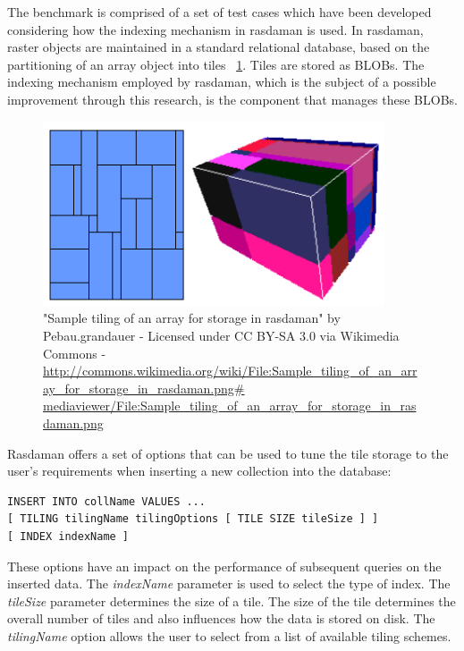 \documentclass[11pt, a4paper, oneside]{article}
\begin{document}
The benchmark is comprised of a set of test cases which have been developed considering how the indexing mechanism in rasdaman is used. In rasdaman, raster objects are maintained in a standard relational database, based on the partitioning of an array object into tiles\cite{DBLP:conf/icde/FurtadoB99} ~\ref{fig:rasdaman-tile}. Tiles are stored as BLOBs. The indexing mechanism employed by rasdaman, which is the subject of a possible improvement through this research, is the component that manages these BLOBs.

\begin{figure}[H]
  \centering
    \includegraphics[width=0.9\textwidth]{img/tiling}
    \caption{"Sample tiling of an array for storage in rasdaman" by Pebau.grandauer - Licensed under CC BY-SA 3.0 via Wikimedia Commons -\url{http://commons.wikimedia.org/wiki/File:Sample_tiling_of_an_array_for_storage_in_rasdaman.png\# mediaviewer/File:Sample_tiling_of_an_array_for_storage_in_rasdaman.png }}
  \label{fig:rasdaman-tile}
\end{figure}

Rasdaman offers a set of options that can be used to tune the tile storage to the user's requirements when inserting a new collection into the database:

\begin{verbatim}
INSERT INTO collName VALUES ...
[ TILING tilingName tilingOptions [ TILE SIZE tileSize ] ]
[ INDEX indexName ]
\end{verbatim}

These options have an impact on the performance of subsequent queries on the inserted data. The \textit{indexName} parameter is used to select the type of index. The \textit{tileSize} parameter determines the size of a tile. The size of the tile determines the overall number of tiles and also influences how the data is stored on disk. The \textit{tilingName} option allows the user to select from a list of available tiling schemes. 
\end{document}
